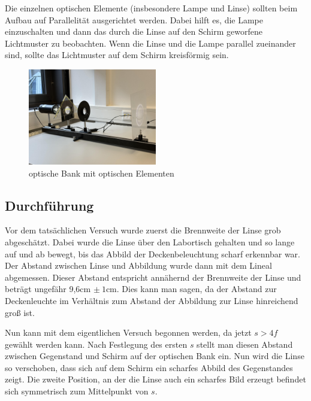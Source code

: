 \documentclass[a4paper,12pt]{article}
\begin{document}
Die einzelnen optischen Elemente (insbesondere Lampe und Linse) sollten beim Aufbau auf Parallelität
ausgerichtet werden. Dabei hilft es, die Lampe einzuschalten und dann das durch die Linse auf den
Schirm geworfene Lichtmuster zu beobachten. Wenn die Linse und die Lampe parallel zueinander sind,
sollte das Lichtmuster auf dem Schirm kreisförmig sein.

\begin{figure}[H]
    \centering
    \includegraphics[width=0.5\textwidth]{bilder/Versuchsaufbau1.jpg}           %
    \caption{optische Bank mit optischen Elementen}                             %
    \label{Abb:Versuchsaufbau1}
\end{figure}

\subsection{Durchführung}
\label{sec:Durchfuehrung}

Vor dem tatsächlichen Versuch wurde zuerst die Brennweite der Linse grob abgeschätzt.
Dabei wurde die Linse über den Labortisch gehalten und so lange auf und ab bewegt, bis das
Abbild der Deckenbeleuchtung scharf erkennbar war. Der Abstand zwischen Linse und Abbildung
wurde dann mit dem Lineal abgemessen. Dieser Abstand entspricht annähernd der Brennweite
der Linse und beträgt ungefähr 9,6cm $\pm\:1\mathrm{cm}$. Dies kann man sagen, da der Abstand
zur Deckenleuchte im Verhältnis zum Abstand der Abbildung zur Linse hinreichend groß ist.

Nun kann mit dem eigentlichen Versuch begonnen werden, da jetzt $s>4f$ gewählt werden kann.
Nach Festlegung des ersten $s$ stellt man diesen Abstand zwischen Gegenstand und Schirm auf der
optischen Bank ein. Nun wird die Linse so verschoben, dass sich auf dem Schirm ein scharfes
Abbild des Gegenstandes zeigt. Die zweite Position, an der die Linse auch ein scharfes Bild erzeugt
befindet sich symmetrisch zum Mittelpunkt von $s$. 
\end{document}
